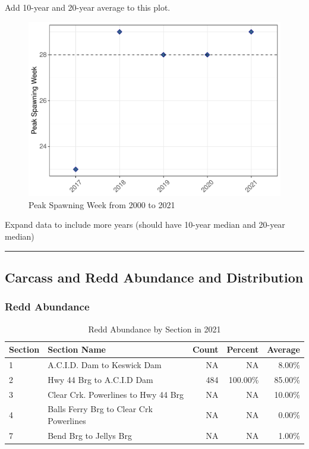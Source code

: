 \documentclass[
]{book}
\theoremstyle{definition}
\theoremstyle{definition}
\theoremstyle{definition}
\theoremstyle{definition}
\theoremstyle{remark}
\begin{document}
Add 10-year and 20-year average to this plot.

\begin{figure}
\centering
\includegraphics{_main_files/figure-latex/spawnweek-fig-1.pdf}
\caption{\label{fig:spawnweek-fig}Peak Spawning Week from 2000 to 2021}
\end{figure}

Expand data to include more years (should have 10-year median and 20-year median)

\begin{center}\rule{0.5\linewidth}{0.5pt}\end{center}

\hypertarget{carcass-and-redd-abundance-and-distribution}{%
\subsection{Carcass and Redd Abundance and Distribution}\label{carcass-and-redd-abundance-and-distribution}}

\hypertarget{redd-abundance}{%
\subsubsection{Redd Abundance}\label{redd-abundance}}

\begin{table}
\centering
\caption{Redd Abundance by Section in 2021}
\centering
\begin{tabular}[t]{llrrr}
\hline
Section & Section Name & Count & Percent & Average\\
\hline
1 & A.C.I.D. Dam to Keswick Dam & NA & NA & 8.00\%\\
\hline
2 & Hwy 44 Brg to A.C.I.D Dam & 484 & 100.00\% & 85.00\%\\
\hline
3 & Clear Crk. Powerlines to Hwy 44 Brg & NA & NA & 10.00\%\\
\hline
4 & Balls Ferry Brg to Clear Crk Powerlines & NA & NA & 0.00\%\\
\hline
7 & Bend Brg to Jellys Brg & NA & NA & 1.00\%\\
\hline
\end{tabular}
\end{table}
\end{document}
